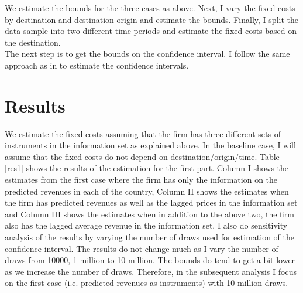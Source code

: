 \documentclass[11pt, letterpaper]{article} \usepackage{amsmath}
\begin{document}
We estimate the bounds for the three cases as above. Next, I vary the
fixed costs by destination and destination-origin and estimate the
bounds. Finally, I split the data sample into two different time
periods and estimate the fixed costs based on the
destination. \\
The next step is to get the bounds on the confidence interval. I
follow the same approach as in \citet{dickstein2018} to estimate the
confidence intervals.
\section{Results}
We estimate the fixed costs assuming that the firm has three different
sets of instruments in the information set as explained above. In the
baseline case, I will assume that the fixed costs do not depend on
destination/origin/time. Table \ref{res1} shows the results of the
estimation for the first part. Column I shows the estimates from the
first case where the firm has only the information on the predicted
revenues in each of the country, Column II shows the estimates when
the firm has predicted revenues as well as the lagged prices in the
information set and Column III shows the estimates when in addition to
the above two, the firm also has the lagged average revenue in the
information set.  I also do sensitivity analysis of the results by
varying the number of draws used for estimation of the confidence
interval. The results do not change much as I vary the number of draws
from 10000, 1 million to 10 million. The bounds do tend to get a bit
lower as we increase the number of draws. Therefore, in the subsequent
analysis I focus on the first case (i.e. predicted revenues as
instruments) with 10 million draws.
\end{document}
